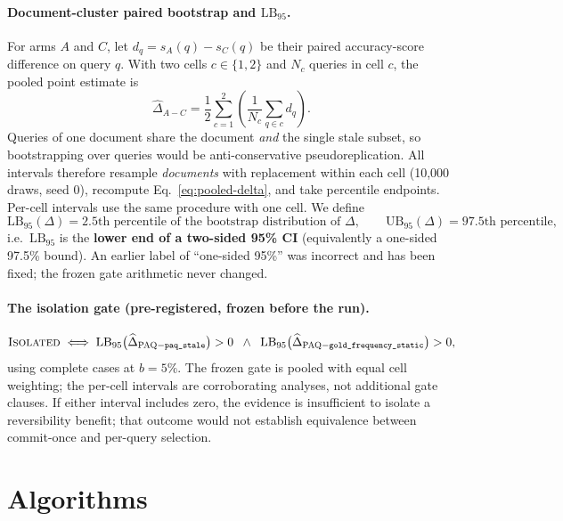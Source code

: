 \documentclass[11pt,letterpaper]{article}
\newcommand{\paq}{\textsc{PAQ}}
\newcommand{\lb}{\mathrm{LB}_{95}}
\begin{document}
\paragraph{Document-cluster paired bootstrap and $\lb$.} For arms $A$ and $C$, let
$d_q=s_A(q)-s_C(q)$ be their paired accuracy-score difference on query $q$. With two cells
$c\in\{1,2\}$ and $N_c$ queries in cell $c$, the pooled point estimate is
\begin{equation}
\widehat{\Delta}_{A-C}
= \frac{1}{2}\sum_{c=1}^{2}\left(\frac{1}{N_c}\sum_{q\in c} d_q\right).
\label{eq:pooled-delta}
\end{equation}
Queries of one document share the document \emph{and} the single stale subset, so bootstrapping
over queries would be anti-conservative pseudoreplication. All intervals therefore resample
\emph{documents} with replacement within each cell (10{,}000 draws, seed 0), recompute
Eq.~\eqref{eq:pooled-delta}, and take percentile endpoints. Per-cell intervals use the same
procedure with one cell. We define
\begin{equation}
\lb(\Delta) = \text{2.5th percentile of the bootstrap distribution of } \Delta,
\qquad
\mathrm{UB}_{95}(\Delta) = \text{97.5th percentile},
\label{eq:lb95}
\end{equation}
i.e.\ $\lb$ is the \textbf{lower end of a two-sided 95\% CI} (equivalently a one-sided 97.5\%
bound). An earlier label of ``one-sided 95\%'' was incorrect and has been fixed; the frozen gate
arithmetic never changed.

\paragraph{The isolation gate (pre-registered, frozen before the run).}
\begin{equation}
\textsc{Isolated} \iff
\lb\bigl(\widehat{\Delta}_{\text{\paq}-\texttt{paq\_stale}}\bigr) > 0
\;\;\wedge\;\;
\lb\bigl(\widehat{\Delta}_{\text{\paq}-\texttt{gold\_frequency\_static}}\bigr) > 0,
\label{eq:gate}
\end{equation}
using complete cases at $b = 5\%$. The frozen gate is pooled with equal cell weighting; the
per-cell intervals are corroborating analyses, not additional gate clauses. If either interval
includes zero, the evidence is insufficient to isolate a reversibility benefit; that outcome
would not establish equivalence between commit-once and per-query selection.

\section{Algorithms}\label{sec:algorithms}
\end{document}
